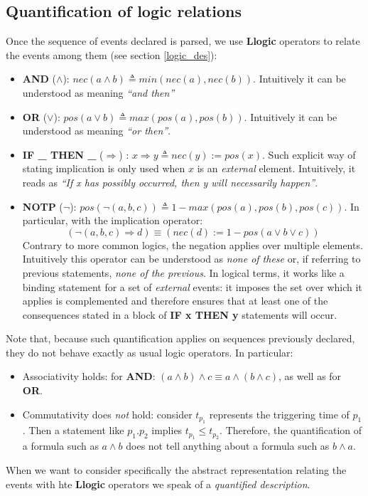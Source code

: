 \documentclass[
		twoside,openright,titlepage,numbers=noenddot,manychapters,
		headinclude,%
                footinclude=false,cleardoublepage=empty,
                BCOR=5mm,
		fontsize=11pt, %
                 enabledeprecatedfontcommands]{scrreprt}
\begin{document}
\subsection{Quantification of logic relations}

Once the sequence of events declared is parsed, we use \textbf{Llogic} operators to relate the events among them (see section \ref{logic_des}):
\begin{itemize}
	  \item  \textbf{AND} ($\wedge $):  $nec(a \wedge b)\triangleq min(nec(a),nec(b))$. Intuitively it can be understood as meaning \emph{``and then''}
    \item \textbf{OR} ($\vee$): $pos(a \vee b)\triangleq max(pos(a),pos(b))$. Intuitively it can be understood as meaning \emph{``or then''}.

    \item \textbf{IF \_  THEN \_  } ($\Rightarrow $) : $x \Rightarrow y \triangleq  nec(y):= pos(x) $. Such explicit way of stating implication is only used when $x$ is an \emph{external} element. Intuitively, it reads as \emph{``If x has possibly occurred, then y will necessarily happen''}.
    \item  \textbf{NOTP} ($ \neg$):  $ pos(\neg ( a,b,c )) \triangleq 1 - max(pos(a),pos(b),pos(c)) $. In particular, with the implication operator: 
\begin{equation*}
( \neg (a,b,c) \Rightarrow d )\equiv (nec(d):=1-pos(a \vee b \vee c))
\end{equation*}
Contrary to more common logics, the negation applies over multiple elements. Intuitively this operator can be understood as \emph{none of these} or, if referring to previous statements, \emph{none of the previous}. In logical terms, it works like a binding statement for a set of \emph{external} events: it imposes the set over which it applies is complemented and therefore ensures that at least one of the consequences stated in a block of \textbf{IF x THEN y} statements will occur.
\end{itemize}

Note that, because such quantification applies on sequences previously declared, they do not behave exactly as usual logic operators. In particular:
\begin{itemize}
    \item Associativity holds: for \textbf{AND}: $(a \wedge b) \wedge c \equiv a \wedge (b \wedge c)$, as well as  for \textbf{OR}.
    \item Commutativity does \emph{not} hold: consider $t_{p_1} $ represents the triggering time of $p_1$. Then a statement like $p_1 . p_2$ implies $t_{p_1} \leq t_{p_2}$. Therefore, the quantification of a formula such as $a \wedge b$ does not tell anything about a formula such as $b \wedge a$.
\end{itemize}
When we want to consider specifically the abstract representation relating the events with hte \textbf{Llogic} operators we speak of a \emph{quantified description}. %
\end{document}
